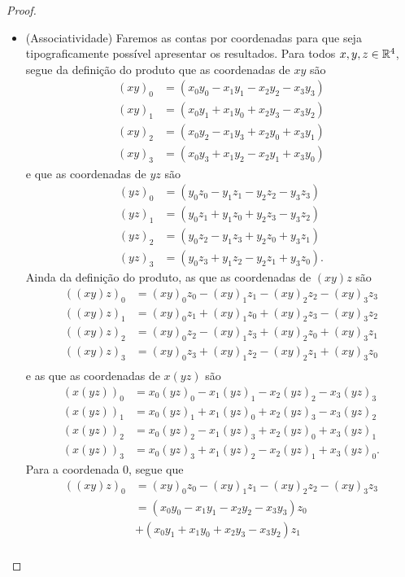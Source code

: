 \begin{proof}
\begin{itemize}
	\item (Associatividade) Faremos as contas por coordenadas para que seja tipograficamente possível apresentar os resultados. Para todos $x,y,z \in \mathbb{R}^4$, segue da definição do produto que as coordenadas de $xy$ são
		\begin{align*}
		(xy)_0 &= (x_0y_0 - x_1y_1 - x_2y_2 - x_3y_3) \\
		(xy)_1 &= (x_0y_1 + x_1y_0 + x_2y_3 - x_3y_2) \\
		(xy)_2 &= (x_0y_2 - x_1y_3 + x_2y_0 + x_3y_1) \\
		(xy)_3 &= (x_0y_3 + x_1y_2 - x_2y_1 + x_3y_0)
		\end{align*}
	e que as coordenadas de $yz$ são
		\begin{align*}
		(yz)_0 &= (y_0z_0 - y_1z_1 - y_2z_2 - y_3z_3) \\
		(yz)_1 &= (y_0z_1 + y_1z_0 + y_2z_3 - y_3z_2) \\
		(yz)_2 &= (y_0z_2 - y_1z_3 + y_2z_0 + y_3z_1) \\
		(yz)_3 &= (y_0z_3 + y_1z_2 - y_2z_1 + y_3z_0).
		\end{align*}
	Ainda da definição do produto, as que as coordenadas de $(xy)z$ são
		\begin{align*}
		((xy)z)_0 &= (xy)_0z_0 - (xy)_1z_1 - (xy)_2z_2 - (xy)_3z_3 \\
		((xy)z)_1 &= (xy)_0z_1 + (xy)_1z_0 + (xy)_2z_3 - (xy)_3z_2 \\
		((xy)z)_2 &= (xy)_0z_2 - (xy)_1z_3 + (xy)_2z_0 + (xy)_3z_1 \\
		((xy)z)_3 &= (xy)_0z_3 + (xy)_1z_2 - (xy)_2z_1 + (xy)_3z_0 \\
		\end{align*}
	e as que as coordenadas de $x(yz)$ são
		\begin{align*}
		(x(yz))_0 &= x_0(yz)_0 - x_1(yz)_1 - x_2(yz)_2 - x_3(yz)_3 \\
		(x(yz))_1 &= x_0(yz)_1 + x_1(yz)_0 + x_2(yz)_3 - x_3(yz)_2 \\
		(x(yz))_2 &= x_0(yz)_2 - x_1(yz)_3 + x_2(yz)_0 + x_3(yz)_1 \\
		(x(yz))_3 &= x_0(yz)_3 + x_1(yz)_2 - x_2(yz)_1 + x_3(yz)_0.
		\end{align*}
	Para a coordenada $0$, segue que
		\begin{align*}
		((xy)z)_0 &= (xy)_0z_0 - (xy)_1z_1 - (xy)_2z_2 - (xy)_3z_3 \\
			&= (x_0y_0 - x_1y_1 - x_2y_2 - x_3y_3)z_0 \\
			&+ (x_0y_1 + x_1y_0 + x_2y_3 - x_3y_2)z_1 \\

\end{align*}
\end{itemize}
\end{proof}
